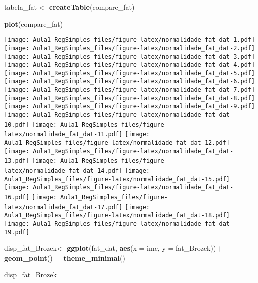 \documentclass[]{article}
\newenvironment{Shaded}{\begin{snugshade}}{\end{snugshade}}
\newcommand{\DataTypeTok}[1]{\textcolor[rgb]{0.13,0.29,0.53}{#1}}
\newcommand{\KeywordTok}[1]{\textcolor[rgb]{0.13,0.29,0.53}{\textbf{#1}}}
\newcommand{\NormalTok}[1]{#1}
\newcommand{\OperatorTok}[1]{\textcolor[rgb]{0.81,0.36,0.00}{\textbf{#1}}}
\newcommand{\StringTok}[1]{\textcolor[rgb]{0.31,0.60,0.02}{#1}}
\begin{document}
\begin{Shaded}
\begin{Highlighting}[]
\NormalTok{tabela_fat <-}\StringTok{ }\KeywordTok{createTable}\NormalTok{(compare_fat)}
\end{Highlighting}
\end{Shaded}

\begin{Shaded}
\begin{Highlighting}[]
\KeywordTok{plot}\NormalTok{(compare_fat)}
\end{Highlighting}
\end{Shaded}

\texttt{[image: Aula1\_RegSimples\_files/figure-latex/normalidade\_fat\_dat-1.pdf]}
\texttt{[image: Aula1\_RegSimples\_files/figure-latex/normalidade\_fat\_dat-2.pdf]}
\texttt{[image: Aula1\_RegSimples\_files/figure-latex/normalidade\_fat\_dat-3.pdf]}
\texttt{[image: Aula1\_RegSimples\_files/figure-latex/normalidade\_fat\_dat-4.pdf]}
\texttt{[image: Aula1\_RegSimples\_files/figure-latex/normalidade\_fat\_dat-5.pdf]}
\texttt{[image: Aula1\_RegSimples\_files/figure-latex/normalidade\_fat\_dat-6.pdf]}
\texttt{[image: Aula1\_RegSimples\_files/figure-latex/normalidade\_fat\_dat-7.pdf]}
\texttt{[image: Aula1\_RegSimples\_files/figure-latex/normalidade\_fat\_dat-8.pdf]}
\texttt{[image: Aula1\_RegSimples\_files/figure-latex/normalidade\_fat\_dat-9.pdf]}
\texttt{[image: Aula1\_RegSimples\_files/figure-latex/normalidade\_fat\_dat-10.pdf]}
\texttt{[image: Aula1\_RegSimples\_files/figure-latex/normalidade\_fat\_dat-11.pdf]}
\texttt{[image: Aula1\_RegSimples\_files/figure-latex/normalidade\_fat\_dat-12.pdf]}
\texttt{[image: Aula1\_RegSimples\_files/figure-latex/normalidade\_fat\_dat-13.pdf]}
\texttt{[image: Aula1\_RegSimples\_files/figure-latex/normalidade\_fat\_dat-14.pdf]}
\texttt{[image: Aula1\_RegSimples\_files/figure-latex/normalidade\_fat\_dat-15.pdf]}
\texttt{[image: Aula1\_RegSimples\_files/figure-latex/normalidade\_fat\_dat-16.pdf]}
\texttt{[image: Aula1\_RegSimples\_files/figure-latex/normalidade\_fat\_dat-17.pdf]}
\texttt{[image: Aula1\_RegSimples\_files/figure-latex/normalidade\_fat\_dat-18.pdf]}
\texttt{[image: Aula1\_RegSimples\_files/figure-latex/normalidade\_fat\_dat-19.pdf]}

\begin{Shaded}
\begin{Highlighting}[]
\NormalTok{disp_fat_Brozek<-}\StringTok{ }\KeywordTok{ggplot}\NormalTok{(fat_dat, }\KeywordTok{aes}\NormalTok{(}\DataTypeTok{x =}\NormalTok{ imc, }\DataTypeTok{y =}\NormalTok{ fat_Brozek))}\OperatorTok{+}
\StringTok{  }\KeywordTok{geom_point}\NormalTok{() }\OperatorTok{+}
\StringTok{  }\KeywordTok{theme_minimal}\NormalTok{()}

\NormalTok{disp_fat_Brozek}
\end{Highlighting}
\end{Shaded}
\end{document}
